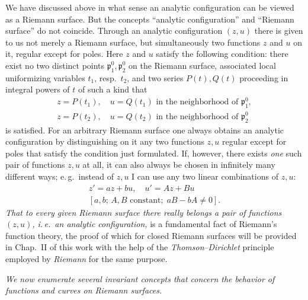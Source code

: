 \documentclass{article}
\begin{document}
We have discussed above in what sense an analytic configuration can be viewed as a Riemann surface. But the concepts ``analytic configuration'' and ``Riemann surface'' do not coincide. Through an analytic configuration $(z, u)$ there is given to us not merely a Riemann surface, but simultaneously two functions $z$ and $u$ on it, regular except for poles. Here $z$ and $u$ satisfy the following condition: there exist no two distinct points $\mathfrak{p}_1^0, \mathfrak{p}_2^0$ on the Riemann surface, associated local uniformizing variables $t_1$, resp.\ $t_2$, and two series $P(t), Q(t)$ proceeding in integral powers of $t$ of such a kind that
\[ \begin{gathered}
z = P(t_1), \quad u = Q(t_1) \text{ in the neighborhood of } \mathfrak{p}_1^0, \\
z = P(t_2), \quad u = Q(t_2) \text{ in the neighborhood of } \mathfrak{p}_2^0
\end{gathered} \]
is satisfied. For an arbitrary Riemann surface one always obtains an analytic configuration by distinguishing on it any two functions $z, u$ regular except for poles that satisfy the condition just formulated. If, however, there exists \emph{one} such pair of functions $z, u$ at all, it can also always be chosen in infinitely many different ways; e.\,g.\ instead of $z, u$ I can use any two linear combinations of $z, u$:
\[ \begin{gathered}
z' = a z + b u, \quad u' = A z + B u \\
[a, b;\, A, B \text{ constant};\; a B - b A \neq 0].
\end{gathered} \]
\emph{That to every given Riemann surface there really belongs a pair of functions $(z, u)$, i.\,e.\ an analytic configuration,} is a fundamental fact of Riemann's function theory, the proof of which for closed Riemann surfaces will be provided in Chap.\ II of this work with the help of the \emph{Thomson}--\emph{Dirichlet} principle employed by \emph{Riemann} for the same purpose.

\emph{We now enumerate several invariant concepts that concern the behavior of functions and curves on Riemann surfaces.}
\end{document}
